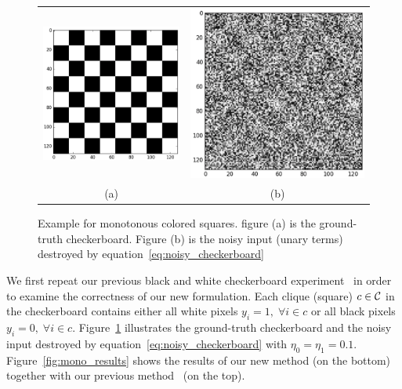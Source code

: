 \begin{figure}[hb]
  \centering
  \setlength{\tabcolsep}{2pt}
  \begin{tabular}{cc}
    \includegraphics[width=0.5\columnwidth]{Part2/figures/mono_gt.png}&
                                                                            \includegraphics[width=0.5\columnwidth]{Part2/figures/mono_noisy.png}\\
    {\small (a)} & {\small (b)} 
  \end{tabular}
  \caption{\label{fig:mono_checkerboard} Example for monotonous
    colored squares. figure (a) is the ground-truth checkerboard.
    Figure (b) is the noisy input (unary terms) destroyed by
    equation~\eqref{eq:noisy_checkerboard}}
\end{figure}

We first repeat our previous black and white checkerboard
experiment~\cite{Gould:ICML2011,gouldlearning} in order to
examine the correctness of our new formulation. Each clique
(square) $c\in {\mathcal{C}}$ in the checkerboard contains either all white
pixels $y_i=1 ,\;\forall i \in c$ or all black pixels $y_i=0
,\;\forall i \in c$. Figure~\ref{fig:mono_checkerboard}
illustrates the ground-truth checkerboard and the noisy input
destroyed by equation~\eqref{eq:noisy_checkerboard} with
$\eta_0=\eta_1=0.1$. Figure~\ref{fig:mono_results} shows the
results of our new method (on the bottom) together with our
previous method~\cite{gouldlearning} (on the top).

